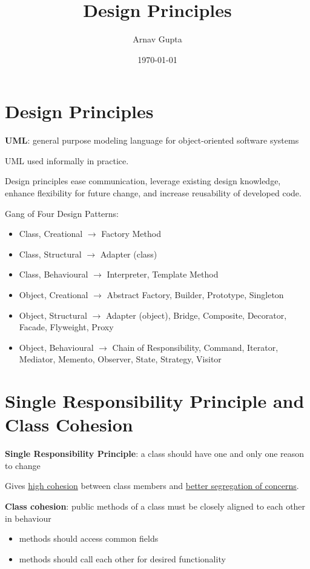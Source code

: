 \documentclass[11pt]{article}
\author{Arnav Gupta}
\date{\today}
\title{Design Principles}
\begin{document}
\maketitle
\tableofcontents

\section{Design Principles}
\label{sec:org6576bf5}
\textbf{UML}: general purpose modeling language for object-oriented software systems

UML used informally in practice.

Design principles ease communication, leverage existing design knowledge,
enhance flexibility for future change, and increase reusability of developed code.

Gang of Four Design Patterns:
\begin{itemize}
\item Class, Creational \(\to\) Factory Method
\item Class, Structural \(\to\) Adapter (class)
\item Class, Behavioural \(\to\) Interpreter, Template Method
\item Object, Creational \(\to\) Abstract Factory, Builder, Prototype, Singleton
\item Object, Structural \(\to\) Adapter (object), Bridge, Composite, Decorator,
Facade, Flyweight, Proxy
\item Object, Behavioural \(\to\) Chain of Responsibility, Command, Iterator, Mediator,
Memento, Observer, State, Strategy, Visitor
\end{itemize}
\section{Single Responsibility Principle and Class Cohesion}
\label{sec:orga7e9c73}
\textbf{Single Responsibility Principle}: a class should have one and only one reason to change

Gives \uline{high cohesion} between class members and \uline{better segregation of concerns}.

\textbf{Class cohesion}: public methods of a class must be closely aligned to each other in
behaviour
\begin{itemize}
\item methods should access common fields
\item methods should call each other for desired functionality
\end{itemize}
\end{document}
